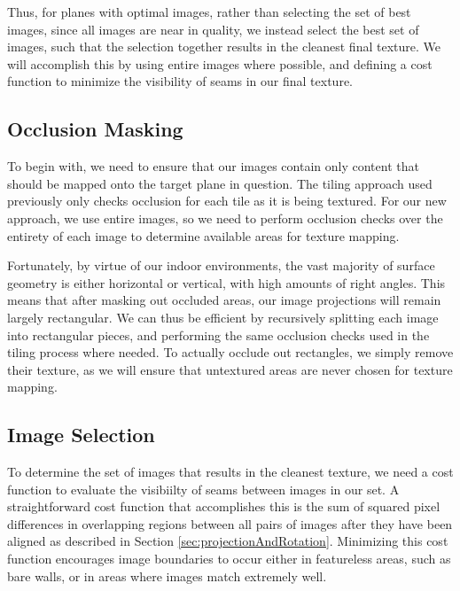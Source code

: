 \message{ !name(paper.tex)}\documentclass[10pt,twocolumn,letterpaper]{article}
\begin{document}
Thus, for planes with optimal images, rather than selecting the set of
best images, since all images are near in quality, we instead select
the best set of images, such that the selection together results in
the cleanest final texture. We will accomplish this by using entire
images where possible, and defining a cost function to minimize the
visibility of seams in our final texture.

\subsection{Occlusion Masking}
\label{sec:occlusionMasking}
To begin with, we need to ensure that our images contain only content
that should be mapped onto the target plane in question. The tiling
approach used previously only checks occlusion for each tile as it is
being textured. For our new approach, we use entire images, so we need
to perform occlusion checks over the entirety of each image to
determine available areas for texture mapping.

Fortunately, by virtue of our indoor environments, the vast majority
of surface geometry is either horizontal or vertical, with high
amounts of right angles. This means that after masking out occluded
areas, our image projections will remain largely rectangular. We can
thus be efficient by recursively splitting each image into rectangular
pieces, and performing the same occlusion checks used in the tiling
process where needed. To actually occlude out rectangles, we simply
remove their texture, as we will ensure that untextured areas are
never chosen for texture mapping.

\subsection{Image Selection}
\label{sec:imageSelection}
To determine the set of images that results in the cleanest texture,
we need a cost function to evaluate the visibiilty of seams between
images in our set. A straightforward cost function that accomplishes
this is the sum of squared pixel differences in overlapping regions
between all pairs of images after they have been aligned as described
in Section \ref{sec:projectionAndRotation}. Minimizing this cost
function encourages image boundaries to occur either in featureless
areas, such as bare walls, or in areas where images match extremely
well.
\end{document}
